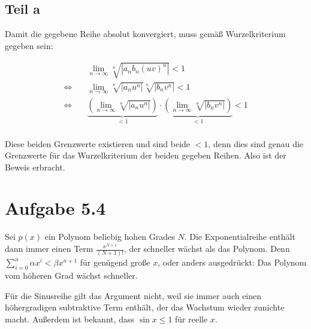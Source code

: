 \documentclass[a4paper,german,12pt,smallheadings]{scrartcl}
\begin{document}
\subsection*{Teil a}

Damit die gegebene Reihe absolut konvergiert, muss gemäß Wurzelkriterium gegeben sein:

\begin{align*}
  &\lim_{n \to \infty} \sqrt[n]{|a_nb_n(uv)^n|} < 1 \\
 \Leftrightarrow\quad&\lim_{n \to \infty} \sqrt[n]{|a_nu^n|} \sqrt[n]{|b_nv^n|} < 1 \\
 \Leftrightarrow\quad&\underbrace{\left(\lim_{n \to \infty} \sqrt[n]{|a_nu^n|}\right)}_{<1} \cdot \underbrace{\left(\lim_{n \to \infty} \sqrt[n]{|b_nv^n|}\right)}_{<1} < 1 \\
\end{align*}

Diese beiden Grenzwerte existieren und sind beide $<1$, denn dies sind genau
die Grenzwerte für das Wurzelkriterium der beiden gegeben Reihen. Also ist der
Beweis erbracht.


\section{Aufgabe 5.4}

Sei $p(x)$ ein Polynom beliebig hohen Grades $N$. Die Exponentialreihe enthält
dann immer einen Term $\frac{x^{N+1}}{(N+1)!}$, der schneller wächst als das
Polynom. Denn $\sum_{i=0}^n \alpha x^i < \beta x^{n+1}$ für genügend große $x$,
oder anders ausgedrückt: Das Polynom vom höheren Grad wächst schneller.

Für die Sinusreihe gilt das Argument nicht, weil sie immer auch einen
höhergradigen subtraktive Term enthält, der das Wachstum wieder zunichte macht.
Außerdem ist bekannt, dass $\sin x \le 1$ für reelle $x$.
\end{document}
